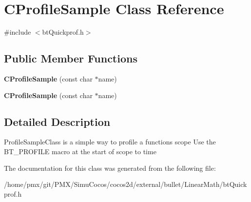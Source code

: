 \hypertarget{classCProfileSample}{}\section{C\+Profile\+Sample Class Reference}
\label{classCProfileSample}


{\ttfamily \#include $<$bt\+Quickprof.\+h$>$}

\subsection*{Public Member Functions}
\begin{DoxyCompactItemize}
\item 
\mbox{\label{classCProfileSample_a63b5cb0514619d4f21e67fa9095752d7}} 
{\bfseries C\+Profile\+Sample} (const char $\ast$name)
\item 
\mbox{\label{classCProfileSample_a63b5cb0514619d4f21e67fa9095752d7}} 
{\bfseries C\+Profile\+Sample} (const char $\ast$name)
\end{DoxyCompactItemize}


\subsection{Detailed Description}
Profile\+Sample\+Class is a simple way to profile a function\textquotesingle{}s scope Use the B\+T\+\_\+\+P\+R\+O\+F\+I\+LE macro at the start of scope to time 

The documentation for this class was generated from the following file\+:\begin{DoxyCompactItemize}
\item 
/home/pmx/git/\+P\+M\+X/\+Simu\+Cocos/cocos2d/external/bullet/\+Linear\+Math/bt\+Quickprof.\+h\end{DoxyCompactItemize}

